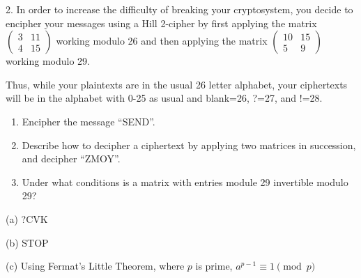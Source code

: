 2. In order to increase the difficulty of breaking your cryptosystem, you decide to encipher your messages using a Hill 2-cipher by first applying the matrix $\begin{pmatrix} 3&11\\4&15 \end{pmatrix}$ working modulo 26 and then applying the matrix $\begin{pmatrix} 10&15\\5&9 \end{pmatrix} $ working modulo 29.

Thus, while your plaintexts are in the usual 26 letter alphabet, your ciphertexts will be in the alphabet with 0-25 as usual and blank=26, ?=27, and !=28.

\begin{enumerate}[label=\alph*)]
  \item Encipher the message “SEND”.
  \item Describe how to decipher a ciphertext by applying two matrices in succession, and decipher “ZMOY”.
  \item Under what conditions is a matrix with entries module 29 invertible modulo 29?
\end{enumerate}

(a) ?CVK

(b) STOP

(c) Using Fermat's Little Theorem, where $p$ is prime, $a^{p-1}\equiv 1 \pmod{p}$
